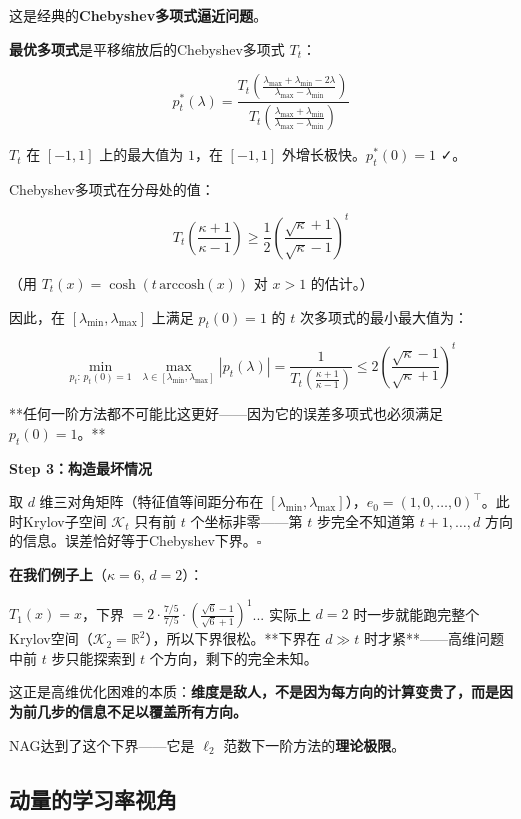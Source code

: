 \documentclass[12pt,a4paper]{article}
\begin{document}
这是经典的\textbf{Chebyshev多项式逼近问题}。

\textbf{最优多项式}是平移缩放后的Chebyshev多项式 $T_t$：


\[p_t^*(\lambda) = \frac{T_t\!\left(\frac{\lambda_{\max}+\lambda_{\min}-2\lambda}{\lambda_{\max}-\lambda_{\min}}\right)}{T_t\!\left(\frac{\lambda_{\max}+\lambda_{\min}}{\lambda_{\max}-\lambda_{\min}}\right)}\]

$T_t$ 在 $[-1, 1]$ 上的最大值为 $1$，在 $[-1, 1]$ 外增长极快。$p_t^*(0) = 1$ ✓。

Chebyshev多项式在分母处的值：


\[T_t\!\left(\frac{\kappa+1}{\kappa-1}\right) \ge \frac{1}{2}\left(\frac{\sqrt\kappa+1}{\sqrt\kappa-1}\right)^t\]

（用 $T_t(x) = \cosh(t\,\text{arccosh}(x))$ 对 $x > 1$ 的估计。）

因此，在 $[\lambda_{\min}, \lambda_{\max}]$ 上满足 $p_t(0)=1$ 的 $t$ 次多项式的最小最大值为：


\[\min_{p_t:\,p_t(0)=1}\ \max_{\lambda \in [\lambda_{\min},\lambda_{\max}]} |p_t(\lambda)| = \frac{1}{T_t\!\left(\frac{\kappa+1}{\kappa-1}\right)} \le 2\left(\frac{\sqrt\kappa-1}{\sqrt\kappa+1}\right)^t\]

**任何一阶方法都不可能比这更好——因为它的误差多项式也必须满足 $p_t(0)=1$。**

\textbf{Step 3：构造最坏情况}

取 $d$ 维三对角矩阵（特征值等间距分布在 $[\lambda_{\min}, \lambda_{\max}]$），$e_0 = (1,0,\ldots,0)^\top$。此时Krylov子空间 $\mathcal{K}_t$ 只有前 $t$ 个坐标非零——第 $t$ 步完全不知道第 $t+1, \ldots, d$ 方向的信息。误差恰好等于Chebyshev下界。$\square$

\textbf{在我们例子上}（$\kappa = 6$, $d = 2$）：

$T_1(x) = x$，下界 $= 2 \cdot \frac{7/5}{7/5} \cdot (\frac{\sqrt{6}-1}{\sqrt{6}+1})^1$... 实际上 $d = 2$ 时一步就能跑完整个Krylov空间（$\mathcal{K}_2 = \mathbb{R}^2$），所以下界很松。**下界在 $d \gg t$ 时才紧**——高维问题中前 $t$ 步只能探索到 $t$ 个方向，剩下的完全未知。

这正是高维优化困难的本质：\textbf{维度是敌人，不是因为每方向的计算变贵了，而是因为前几步的信息不足以覆盖所有方向。}

NAG达到了这个下界——它是 $\ell_2$ 范数下一阶方法的\textbf{理论极限}。


\subsection{动量的学习率视角}
\end{document}
